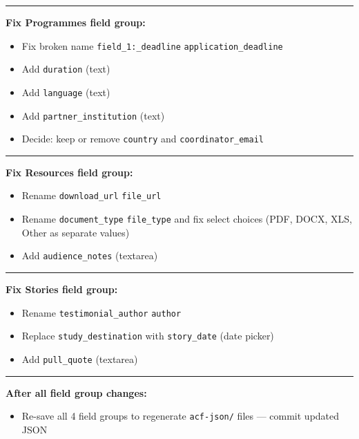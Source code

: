 \documentclass[11pt,a4paper]{article}
\newcommand{\grouprule}{\vspace{0.3em}\textcolor{ruleLine}{\rule{\linewidth}{0.4pt}}\vspace{0.3em}}
\begin{document}
\grouprule

\noindent\textbf{Fix Programmes field group:}

\begin{itemize}
    \item[$\square$] Fix broken name \texttt{field\_1:\_deadline} \textrightarrow{} \texttt{application\_deadline}
    \item[$\square$] Add \texttt{duration} (text)
    \item[$\square$] Add \texttt{language} (text)
    \item[$\square$] Add \texttt{partner\_institution} (text)
    \item[$\square$] Decide: keep or remove \texttt{country} and \texttt{coordinator\_email}
\end{itemize}

\grouprule

\noindent\textbf{Fix Resources field group:}

\begin{itemize}
    \item[$\square$] Rename \texttt{download\_url} \textrightarrow{} \texttt{file\_url}
    \item[$\square$] Rename \texttt{document\_type} \textrightarrow{} \texttt{file\_type} and fix select choices (PDF, DOCX, XLS, Other as separate values)
    \item[$\square$] Add \texttt{audience\_notes} (textarea)
\end{itemize}

\grouprule

\noindent\textbf{Fix Stories field group:}

\begin{itemize}
    \item[$\square$] Rename \texttt{testimonial\_author} \textrightarrow{} \texttt{author}
    \item[$\square$] Replace \texttt{study\_destination} with \texttt{story\_date} (date picker)
    \item[$\square$] Add \texttt{pull\_quote} (textarea)
\end{itemize}

\grouprule

\noindent\textbf{After all field group changes:}

\begin{itemize}
    \item[$\square$] Re-save all 4 field groups to regenerate \texttt{acf-json/} files --- commit updated JSON
\end{itemize}
\end{document}
